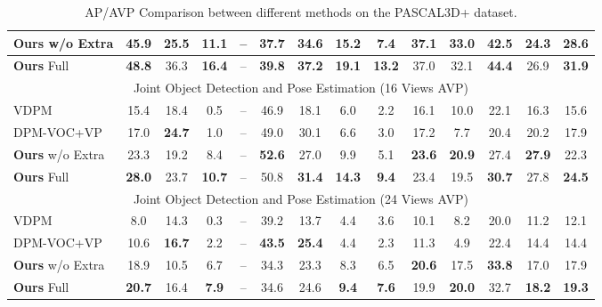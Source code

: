 \documentclass[10pt,twocolumn,letterpaper]{article}
\begin{document}
\begin{table*}
\begin{tabular}{|l||c|c|c|c|c|c|c|c|c|c|c|c||c|}
		\hline \textbf{Ours} w/o Extra & 45.9 & 25.5 & 11.1 & -- & 37.7 & 34.6 & 15.2 & 7.4 & \textbf{37.1} & \textbf{33.0} & 42.5 & 24.3 & 28.6 \\
		\hline \textbf{Ours} Full & \textbf{48.8} & 36.3 & \textbf{16.4} & -- & \textbf{39.8} & \textbf{37.2} & \textbf{19.1} & \textbf{13.2} & 37.0 & 32.1 & \textbf{44.4} & 26.9 & \textbf{31.9} \\	
		\hline	
		\hline \multicolumn{14}{|c|}{Joint Object Detection and Pose Estimation (16 Views AVP)} \\
		\hline VDPM \cite{xiang2014beyond} & 15.4 & 18.4 & 0.5 & -- & 46.9 & 18.1 & 6.0 & 2.2 & 16.1 & 10.0 & 22.1 & 16.3 & 15.6 \\		
		\hline DPM-VOC+VP \cite{bojan15pami} & 17.0 & \textbf{24.7} & 1.0 & -- & 49.0 & 30.1 & 6.6 & 3.0 & 17.2 & 7.7 & 20.4 & 20.2 & 17.9 \\
		\hline \textbf{Ours} w/o Extra & 23.3 & 19.2 & 8.4 & -- & \textbf{52.6} & 27.0 & 9.9 & 5.1 & \textbf{23.6} & \textbf{20.9} & 27.4 & \textbf{27.9} & 22.3 \\
		\hline \textbf{Ours} Full & \textbf{28.0} & 23.7 & \textbf{10.7} & -- & 50.8 & \textbf{31.4} & \textbf{14.3} & \textbf{9.4} & 23.4 & 19.5 & \textbf{30.7} & 27.8 & \textbf{24.5} \\					
		\hline
		\hline \multicolumn{14}{|c|}{Joint Object Detection and Pose Estimation (24 Views AVP)} \\
		\hline VDPM \cite{xiang2014beyond} & 8.0 & 14.3 & 0.3 & -- & 39.2 & 13.7 & 4.4 & 3.6 & 10.1 & 8.2 & 20.0 & 11.2 & 12.1 \\		
		\hline DPM-VOC+VP \cite{bojan15pami} & 10.6 & \textbf{16.7} & 2.2 & -- & \textbf{43.5} & \textbf{25.4} & 4.4 & 2.3 & 11.3 & 4.9 & 22.4 & 14.4 & 14.4 \\
		\hline \textbf{Ours} w/o Extra & 18.9 & 10.5 & 6.7 & -- & 34.3 & 23.3 & 8.3 & 6.5 & \textbf{20.6} & 17.5 & \textbf{33.8} & 17.0 & 17.9 \\
		\hline \textbf{Ours} Full & \textbf{20.7} & 16.4 & \textbf{7.9} & -- & 34.6 & 24.6 & \textbf{9.4} & \textbf{7.6} & 19.9 & \textbf{20.0} & 32.7 & \textbf{18.2} & \textbf{19.3} \\						
		\hline		
		
	\end{tabular}
	\caption{AP/AVP Comparison between different methods on the PASCAL3D+ dataset.}
	\label{tab:pascal3d}
	\vspace{-2mm}
\end{table*}
\end{document}

